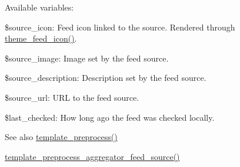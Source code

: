 Available variables:
\begin{DoxyItemize}
\item \$source\_\-icon: Feed icon linked to the source. Rendered through \hyperlink{group__themeable_gaf7ed9df27bf344443ce927e3650adfbd}{theme\_\-feed\_\-icon()}.
\item \$source\_\-image: Image set by the feed source.
\item \$source\_\-description: Description set by the feed source.
\item \$source\_\-url: URL to the feed source.
\item \$last\_\-checked: How long ago the feed was checked locally.
\end{DoxyItemize}

\begin{DoxySeeAlso}{See also}
\hyperlink{includes_2theme_8inc_a3eeb7bcdba7ef4859f99586da264d347}{template\_\-preprocess()} 

\hyperlink{aggregator_8pages_8inc_a06bc89c22bcd3b3c70c9c1d19391aefc}{template\_\-preprocess\_\-aggregator\_\-feed\_\-source()} 
\end{DoxySeeAlso}
